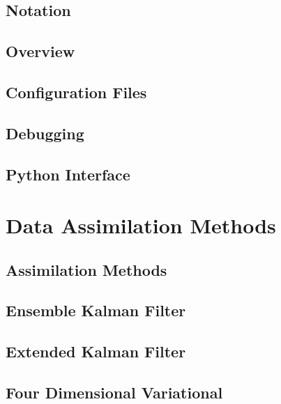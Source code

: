 \documentclass{book}
\begin{document}
\chapter{Notation}
\label{notation}
\hypertarget{notation}{}

\chapter{Overview}
\label{overview}
\hypertarget{overview}{}

\chapter{Configuration Files}
\label{configuration_files}
\hypertarget{configuration_files}{}

\chapter{Debugging}
\label{debugging}
\hypertarget{debugging}{}

\chapter{Python Interface}
\label{python}
\hypertarget{python}{}

\part{Data Assimilation Methods}
\chapter{Assimilation Methods}
\label{assimilation_methods}
\hypertarget{assimilation_methods}{}

\chapter{Ensemble Kalman Filter}
\label{ensemble_kalman_filter}
\hypertarget{ensemble_kalman_filter}{}

\chapter{Extended Kalman Filter}
\label{extended_kalman_filter}
\hypertarget{extended_kalman_filter}{}

\chapter{Four Dimensional Variational}
\label{four_dimensional_variational}
\hypertarget{four_dimensional_variational}{}

\end{document}
